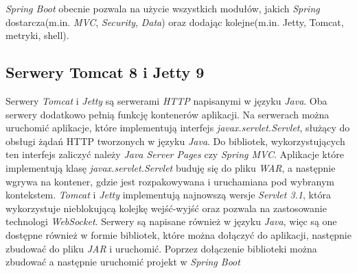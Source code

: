 \textsl{Spring Boot} obecnie pozwala na użycie wszystkich modułów, jakich \textsl{Spring} dostarcza(m.in. \textsl{MVC}, \textsl{Security}, \textsl{Data}) oraz dodając kolejne(m.in. Jetty, Tomcat, metryki, shell). 

\subsection{Serwery Tomcat 8 i Jetty 9} 
Serwery \textsl{Tomcat} i \textsl{Jetty} są serwerami \textsl{HTTP} napisanymi w języku \textsl{Java}. Oba serwery dodatkowo pełnią funkcję kontenerów aplikacji. Na serwerach można uruchomić aplikacje, które implementują interfejs \textsl{javax.servlet.Servlet}, służący do obsługi żądań HTTP tworzonych w języku \textsl{Java}. Do bibliotek, wykorzystujących ten interfejs zaliczyć należy \textsl{Java Server Pages} czy \textsl{Spring MVC}. Aplikacje które implementują klasę \textsl{javax.servlet.Servlet} buduję się do pliku \textsl{WAR}, a następnie wgrywa na kontener, gdzie jest rozpakowywana i uruchamiana pod wybranym kontekstem. \textsl{Tomcat} i \textsl{Jetty} implementują najnowszą wersje \textsl{Servlet 3.1}, która wykorzystuje nieblokującą kolejkę wejść-wyjść oraz pozwala na zastosowanie technologi \textsl{WebSocket}. Serwery są napisane również w języku \textsl{Java}, więc są one dostępne również w formie bibliotek, które można dołączyć do aplikacji, następnie zbudować do pliku \textsl{JAR} i uruchomić. Poprzez dołączenie biblioteki można zbudować a następnie uruchomić projekt w \textsl{Spring Boot}
